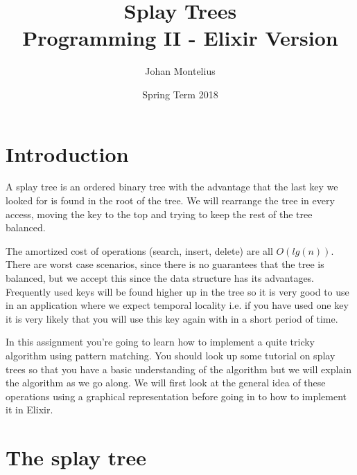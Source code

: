 \documentclass[a4paper,11pt]{article}
\begin{document}

\title{
    \textbf{Splay Trees}\\
    \large{Programming II - Elixir Version}
}
\author{Johan Montelius}
\date{Spring Term 2018}
\maketitle
\thispagestyle{fancy}



\section*{Introduction}

A splay tree is an ordered binary tree with the advantage that the
last key we looked for is found in the root of the tree. We will 
rearrange the tree in every access, moving the key to the top and
trying to keep the rest of the tree balanced.

The amortized cost of operations (search, insert, delete) are all
$O(lg(n))$. There are worst case scenarios, since there is no
guarantees that the tree is balanced, but we accept this since the data
structure has its advantages. Frequently used keys will be found
higher up in the tree so it is very good to use in an application
where we expect temporal locality i.e. if you have used one key it is
very likely that you will use this key again with in a short period of time.

In this assignment you're going to learn how to implement a quite
tricky algorithm using pattern matching. You should look up some
tutorial on splay trees so that you have a basic understanding of the
algorithm but we will explain the algorithm as we go along. We will
first look at the general idea of these operations using a graphical
representation before going in to how to implement it in Elixir. 



\section{The splay tree}
\end{document}
